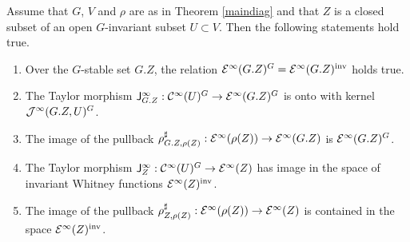\begin{proposition} \label{surgrp} Assume that $G$, $V$ and $\rho$ are as in Theorem \ref{maindiag} 
  and that $Z$ is a closed subset of an open $G$-invariant subset $U\subset V$. 
  Then the following statements hold true.
\begin{enumerate} 
\item \label{surInvRels}
  Over the $G$-stable set $G.Z$, the relation
  $\mathcal{E}^\infty(G.Z)^G = \mathcal{E}^\infty(G.Z)^\textup{inv}$ holds true.
\item \label{surJgrp} 
 The Taylor morphism $\mathsf{J}^\infty_{G.Z}: \mathcal{C}^\infty(U)^G\to \mathcal{E}^\infty(G.Z)^G$ is onto 
  with kernel $\mathcal{J}^\infty(G.Z,U)^G$. 
\item \label{surpbgrp} 
  The image of the pullback $\rho^{\sharp}_{G.Z,\rho(Z)}:\mathcal{E}^\infty(\rho(Z))\to \mathcal{E}^\infty(G.Z)$ 
  is $\mathcal{E}^\infty(G.Z)^G$.
\item \label{imJgrpd} 
  The Taylor morphism $\mathsf{J}^\infty_{Z}: \mathcal{C}^\infty(U)^G\to \mathcal{E}^\infty(Z)$ has image 
  in the space of invariant Whitney functions $\mathcal{E}^\infty(Z)^\textup{inv}$.
\item \label{impbgrpd} 
  The image of the pullback $\rho^{\sharp}_{Z,\rho(Z)}:\mathcal{E}^\infty(\rho(Z))\to \mathcal{E}^\infty(Z)$ is 
  contained in  the space $\mathcal{E}^\infty(Z)^\textup{inv}$. 
\end{enumerate}
\end{proposition}

